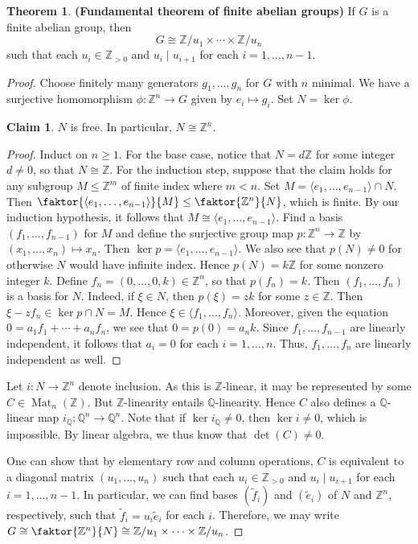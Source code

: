 \documentclass[10pt,letterpaper,cm]{nupset}
\theoremstyle{definition}
\newtheorem{claim}{Claim}
\newtheorem{theorem}{Theorem}
\newcommand{\Q}{\mathbb Q}
\newcommand{\Z}{\mathbb Z}
\newcommand{\1}{\mathbf{1}}
\newcommand{\0}{\vec 0}
\DeclareMathOperator{\Mat}{Mat}
\begin{document}
\begin{theorem}{\textbf{(Fundamental theorem of finite abelian groups)}}
If $G$ is a finite abelian group, then $$ G \cong \Z/u_1 \times \cdots \times \Z/u_n$$ such that each $u_i \in \Z_{>0}$ and $u_i \mid u_{i+1}$ for each $i=1, \ldots, n-1$.
\end{theorem}
\begin{proof}
Choose finitely many generators $g_1, \ldots, g_n$ for $G$ with $n$ minimal. We have a surjective homomorphism $\phi : \Z^n \to G$ given by $e_i \mapsto g_i$. Set $ N = \ker \phi$.
\begin{claim}
$N$ is free. In particular, $N \cong \Z^n$.
\end{claim}
\begin{proof}
Induct on $n\geq 1$. For the base case, notice that  $N = d\Z$ for some integer $d\ne 0$, so that $N \cong \Z$. For the induction step, suppose that the claim holds for any subgroup $M\leq \Z^m$ of finite index where $m<n$. Set $M = \langle e_1, \ldots, e_{n-1}\rangle\cap N$. Then $\faktor{\langle e_1, \ldots, e_{n-1}\rangle}{M}\leq \faktor{\Z^n}{N}$, which is finite. By our induction hypothesis, it follows that $M \cong \langle e_1, \ldots, e_{n-1}\rangle$. Find a basis $(f_1, \ldots, f_{n-1})$ for $M$ and define the surjective group map $p : \Z^n \to \Z$ by $(x_1, \ldots, x_n) \mapsto x_n.$ Then $\ker p = \langle e_1, \ldots, e_{n-1}\rangle$. We also see that $p(N) \ne 0$ for otherwise $N$ would have infinite index. Hence $p(N) = k\Z$ for some nonzero integer $k$. Define $f_n = (0, \ldots, 0, k)\in \Z^n$, so that $p(f_n) =k$. Then $(f_1, \ldots, f_n)$ is a basis for $N$. Indeed, if $\xi \in N$, then $p(\xi) = zk$ for some $z\in \Z$. Then $\xi - zf_n \in \ker p \cap N = M$. Hence $\xi \in \langle f_1, \ldots, f_n\rangle$. Moreover, given the equation $0 = a_1f_1 + \cdots + a_nf_n$, we see that $0= p(0) = a_nk$. Since $f_1, \ldots, f_{n-1}$ are linearly independent, it follows that $a_i= 0$ for each $i=1, \ldots, n$. Thus, $f_1, \ldots, f_n$ are linearly independent as well.
\end{proof}
Let $i : N \to \Z^n$ denote inclusion. As this is $\Z$-linear, it may be represented by some $C\in \Mat_n(\Z)$. But $\Z$-linearity entails $\Q$-linearity. Hence $C$ also defines a $\Q$-linear map $i_{\Q} : \Q^n \to \Q^n$. Note that if $\ker i_{\Q} \ne 0$, then $\ker i \ne 0$, which is impossible. By linear algebra, we thus know that $\det(C) \ne 0$.

One can show that by elementary row and column operations, $C$ is equivalent to a diagonal matrix $(u_1, \ldots, u_n)$ such that each $u_i \in \Z_{>0}$ and $u_i \mid u_{i+1}$ for each $i=1, \ldots, n-1$. In particular, we can find bases $(\tilde{f}_i)$ and $(\tilde{e}_i)$ of $N$ and $\Z^n$, respectively, such that $ \tilde{f}_i = u_i \tilde{e}_i$ for each $i$. Therefore, we may write $G\cong \faktor{\Z^n}{N} \cong \Z/u_1 \times \cdots \times \Z/u_n$.
\end{proof}
\end{document}
